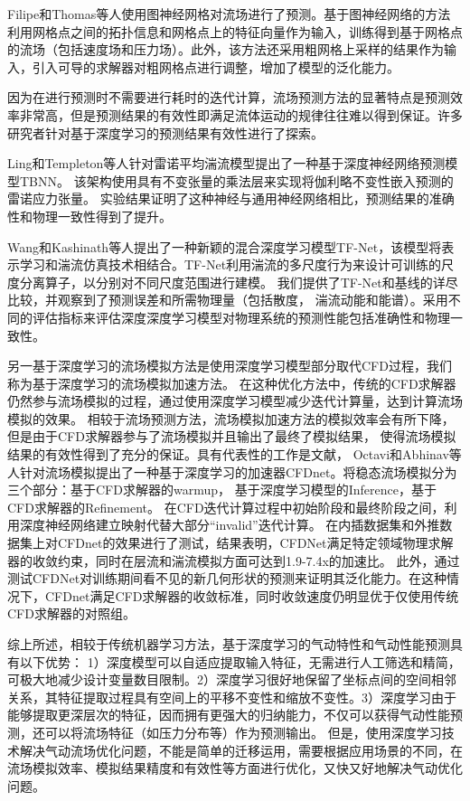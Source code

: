 Filipe和Thomas等人\cite{2020Combining}使用图神经网格对流场进行了预测。基于图神经网络的方法利用网格点之间的拓扑信息和网格点上的特征向量作为输入，训练得到基于网格点的流场（包括速度场和压力场）。此外，该方法还采用粗网格上采样的结果作为输入，引入可导的求解器对粗网格点进行调整，增加了模型的泛化能力。

因为在进行预测时不需要进行耗时的迭代计算，流场预测方法的显著特点是预测效率非常高，但是预测结果的有效性即满足流体运动的规律往往难以得到保证。许多研究者针对基于深度学习的预测结果有效性进行了探索。

Ling和Templeton等人\cite{invariance}针对雷诺平均湍流模型提出了一种基于深度神经网络预测模型TBNN。
该架构使用具有不变张量的乘法层来实现将伽利略不变性嵌入预测的雷诺应力张量。 
实验结果证明了这种神经与通用神经网络相比，预测结果的准确性和物理一致性得到了提升。

Wang和Kashinath\cite{DBLP:journals/nips2019}等人提出了一种新颖的混合深度学习模型TF-Net，该模型将表示学习和湍流仿真技术相结合。TF-Net利用湍流的多尺度行为来设计可训练的尺度分离算子，以分别对不同尺度范围进行建模。 我们提供了TF-Net和基线的详尽比较，并观察到了预测误差和所需物理量（包括散度，
湍流动能和能谱）。采用不同的评估指标来评估深度深度学习模型对物理系统的预测性能包括准确性和物理一致性。

另一基于深度学习的流场模拟方法是使用深度学习模型部分取代CFD过程，我们称为基于深度学习的流场模拟加速方法。
在这种优化方法中，传统的CFD求解器仍然参与流场模拟的过程，通过使用深度学习模型减少迭代计算量，达到计算流场模拟的效果。
相较于流场预测方法，流场模拟加速方法的模拟效率会有所下降，但是由于CFD求解器参与了流场模拟并且输出了最终了模拟结果，
使得流场模拟结果的有效性得到了充分的保证。具有代表性的工作是文献\cite{cfdnet}，
Octavi和Abhinav等人针对流场模拟提出了一种基于深度学习的加速器CFDnet。将稳态流场模拟分为三个部分：基于CFD求解器的warmup，
基于深度学习模型的Inference，基于CFD求解器的Refinement。
在CFD迭代计算过程中初始阶段和最终阶段之间，利用深度神经网络建立映射代替大部分“invalid”迭代计算。
在内插数据集和外推数据集上对CFDnet的效果进行了测试，结果表明，CFDNet满足特定领域物理求解器的收敛约束，同时在层流和湍流模拟方面可达到1.9-7.4x的加速比。 此外，通过测试CFDNet对训练期间看不见的新几何形状的预测来证明其泛化能力。在这种情况下，CFDnet满足CFD求解器的收敛标准，同时收敛速度仍明显优于仅使用传统CFD求解器的对照组。


综上所述，相较于传统机器学习方法，基于深度学习的气动特性和气动性能预测具有以下优势：
1）深度模型可以自适应提取输入特征，无需进行人工筛选和精简，可极大地减少设计变量数目限制。2）深度学习很好地保留了坐标点间的空间相邻关系，其特征提取过程具有空间上的平移不变性和缩放不变性。3）深度学习由于能够提取更深层次的特征，因而拥有更强大的归纳能力，不仅可以获得气动性能预测，还可以将流场特征（如压力分布等）作为预测输出。
但是，使用深度学习技术解决气动流场优化问题，不能是简单的迁移运用，需要根据应用场景的不同，在流场模拟效率、模拟结果精度和有效性等方面进行优化，又快又好地解决气动优化问题。

